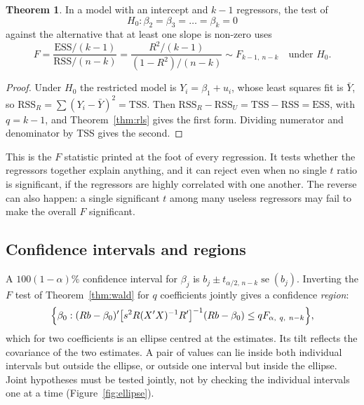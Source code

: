 \documentclass[11pt,a4paper]{article}
\numberwithin{equation}{section}
\theoremstyle{definition}
\newtheorem{thm}{Theorem}[subsection]
\begin{document}
\begin{thm}
\label{thm:overallF}
In a model with an intercept and $k - 1$ regressors, the test of
\[
H_0\colon \beta_2 = \beta_3 = \dots = \beta_k = 0
\]
against the alternative that at least one slope is non-zero uses
\[
F = \frac{\text{ESS}/(k - 1)}{\text{RSS}/(n - k)} = \frac{R^2/(k - 1)}{(1 - R^2)/(n - k)} \sim F_{k-1,\ n-k} \quad\text{under } H_0 .
\]
\end{thm}

\begin{proof}
Under $H_0$ the restricted model is $Y_i = \beta_1 + u_i$, whose least squares fit is $\bar Y$, so $\text{RSS}_R = \sum (Y_i - \bar Y)^2 = \text{TSS}$. Then
$\text{RSS}_R - \text{RSS}_U = \text{TSS} - \text{RSS} = \text{ESS}$, with $q = k - 1$, and Theorem~\ref{thm:rls} gives the first form. Dividing numerator and
denominator by TSS gives the second.
\end{proof}

This is the $F$ statistic printed at the foot of every regression. It tests whether the regressors together explain anything, and it can reject even
when no single $t$ ratio is significant, if the regressors are highly correlated with one another. The reverse can also happen: a single significant $t$
among many useless regressors may fail to make the overall $F$ significant.

\subsection{Confidence intervals and regions}
\label{ssec:confreg}

A $100(1 - \alpha)\%$ confidence interval for $\beta_j$ is $b_j \pm t_{\alpha/2,\,n-k}\operatorname{se}(b_j)$. Inverting the $F$ test of
Theorem~\ref{thm:wald} for $q$ coefficients jointly gives a confidence \emph{region}:
\[
\Bigl\{\beta_0 : (Rb - \beta_0)'\bigl[s^2R(X'X)^{-1}R'\bigr]^{-1}(Rb - \beta_0) \leq qF_{\alpha,\ q,\ n-k}\Bigr\},
\]
which for two coefficients is an ellipse centred at the estimates. Its tilt reflects the covariance of the two estimates. A pair of values can lie
inside both individual intervals but outside the ellipse, or outside one interval but inside the ellipse. Joint hypotheses must be tested jointly,
not by checking the individual intervals one at a time (Figure~\ref{fig:ellipse}).
\end{document}
